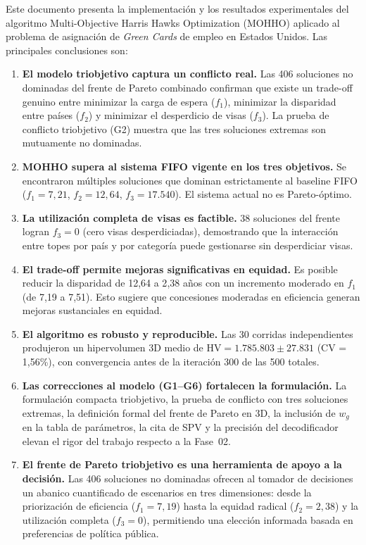 \documentclass[12pt,letterpaper]{article}
\begin{document}
Este documento presenta la implementación y los resultados experimentales del algoritmo Multi-Objective Harris Hawks Optimization (MOHHO) aplicado al problema de asignación de \textit{Green Cards} de empleo en Estados Unidos. Las principales conclusiones son:

\begin{enumerate}
    \item \textbf{El modelo triobjetivo captura un conflicto real.} Las 406 soluciones no dominadas del frente de Pareto combinado confirman que existe un trade-off genuino entre minimizar la carga de espera ($f_1$), minimizar la disparidad entre países ($f_2$) y minimizar el desperdicio de visas ($f_3$). La prueba de conflicto triobjetivo (G2) muestra que las tres soluciones extremas son mutuamente no dominadas.

    \item \textbf{MOHHO supera al sistema FIFO vigente en los tres objetivos.} Se encontraron múltiples soluciones que dominan estrictamente al baseline FIFO ($f_1 = 7{,}21$, $f_2 = 12{,}64$, $f_3 = 17.540$). El sistema actual no es Pareto-óptimo.

    \item \textbf{La utilización completa de visas es factible.} 38 soluciones del frente logran $f_3 = 0$ (cero visas desperdiciadas), demostrando que la interacción entre topes por país y por categoría puede gestionarse sin desperdiciar visas.

    \item \textbf{El trade-off permite mejoras significativas en equidad.} Es posible reducir la disparidad de 12{,}64 a 2{,}38 años con un incremento moderado en $f_1$ (de 7{,}19 a 7{,}51). Esto sugiere que concesiones moderadas en eficiencia generan mejoras sustanciales en equidad.

    \item \textbf{El algoritmo es robusto y reproducible.} Las 30 corridas independientes produjeron un hipervolumen 3D medio de $\text{HV} = 1.785.803 \pm 27.831$ (CV = 1{,}56\%), con convergencia antes de la iteración 300 de las 500 totales.

    \item \textbf{Las correcciones al modelo (G1--G6) fortalecen la formulación.} La formulación compacta triobjetivo, la prueba de conflicto con tres soluciones extremas, la definición formal del frente de Pareto en 3D, la inclusión de $w_g$ en la tabla de parámetros, la cita de SPV \parencite{bean1994} y la precisión del decodificador elevan el rigor del trabajo respecto a la Fase~02.

    \item \textbf{El frente de Pareto triobjetivo es una herramienta de apoyo a la decisión.} Las 406 soluciones no dominadas ofrecen al tomador de decisiones un abanico cuantificado de escenarios en tres dimensiones: desde la priorización de eficiencia ($f_1 = 7{,}19$) hasta la equidad radical ($f_2 = 2{,}38$) y la utilización completa ($f_3 = 0$), permitiendo una elección informada basada en preferencias de política pública.
\end{enumerate}
\end{document}
